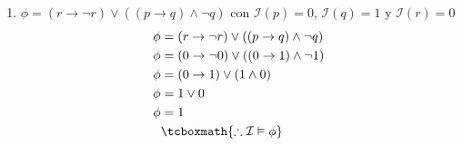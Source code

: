\documentclass[10pt,letterpaper]{article}
\begin{document}
\begin{enumerate}
\begin{enumerate}
            \item $\phi = (r \rightarrow \neg r) \lor ((p \rightarrow q) \land \neg q)$ con
                $\mathcal{I}(p) = 0$, $\mathcal{I}(q) = 1$ y $\mathcal{I}(r) = 0$
                \begin{equation*} \begin{split} \begin{aligned}
                    \phi &= (r \rightarrow \neg r) \lor ((p \rightarrow q) \land \neg q) \\
                    \phi &= (0 \rightarrow \neg 0) \lor ((0 \rightarrow 1) \land \neg 1) \\
                    \phi &= (0 \rightarrow 1) \lor (1 \land 0) \\
                    \phi &= 1 \lor 0 \\
                    \phi &= 1 \\
                    &\tcboxmath{\therefore \mathcal{I} \vDash \phi}
                \end{aligned} \end{split} \end{equation*}
        \end{enumerate}
\end{enumerate}
\end{document}
